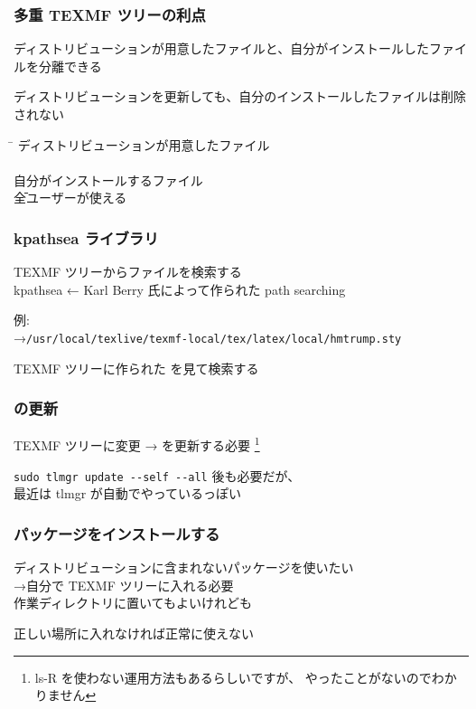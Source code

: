 \begin{frame}
	\frametitle{多重 TEXMF ツリーの利点}
	ディストリビューションが用意したファイルと、自分がインストールしたファイルを分離できる

	ディストリビューションを更新しても、自分のインストールしたファイルは削除されない

	\begin{tabbing}
	\hspace*{3\zw}\=\kill
	ディストリビューションが用意したファイル\\
		\\
	自分がインストールするファイル\\
		\hspace{1\zw}\={\scriptsize 全ユーザーが使える}\\
	\end{tabbing}
\end{frame}

\begin{frame}
	\frametitle{kpathsea ライブラリ}
	TEXMF ツリーからファイルを検索する\\
	{\footnotesize kpathsea ← Karl Berry 氏によって作られた path searching}

	例: \\
	{\scriptsize →\texttt{/usr/local/texlive/texmf-local/tex/latex/local/hmtrump.sty}}

	TEXMF ツリーに作られた  を見て検索する
\end{frame}

\begin{frame}
	\frametitle{ の更新}
	TEXMF ツリーに変更 →  を更新する必要
	\footnote{ls-R を使わない運用方法もあるらしいですが、
	やったことがないのでわかりません}


	{\scriptsize \texttt{sudo tlmgr update -{}-self -{}-all} 後も必要だが、\\
	最近は tlmgr が自動でやっているっぽい}
\end{frame}

\begin{frame}
	\frametitle{パッケージをインストールする}
	ディストリビューションに含まれないパッケージを使いたい\\
	→自分で TEXMF ツリーに入れる必要\\
	{\footnotesize 作業ディレクトリに置いてもよいけれども}

	正しい場所に入れなければ正常に使えない
\end{frame}

